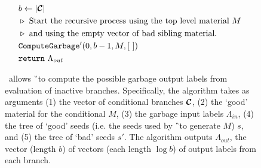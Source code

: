 \begin{figure}
\begin{align*}
    \\
    &~~b \gets |\vec{\cir}|\\
    &~~\codecomment{Start the recursive process using the top level material $\mat$}\\
    &~~\codecomment{and using the empty vector of bad sibling material.}\\
    &~~\computegarbage'(0, b-1, \mat, [~])\\
    &~~\creturn~\Lambda_{out}
  \end{align*}
  \caption{%
    \computegarbage\ allows \G\ to compute the possible garbage output labels
    from evaluation of inactive branches.
    Specifically, the algorithm takes as arguments (1) the vector of
    conditional branches $\vec{\cir}$, (2) the `good' material for the
    conditional $M$, (3) the garbage input labels $\Lambda_{in}$, (4)
    the tree of `good' seeds (i.e. the seeds used by \G\ to generate
    $M$) $s$, and (5) the tree of `bad' seeds $s'$.
    The algorithm outputs $\Lambda_{out}$, the vector (length $b$) of
    vectors (each length $\log b$) of output labels from each
    branch.
  }
\end{figure}
